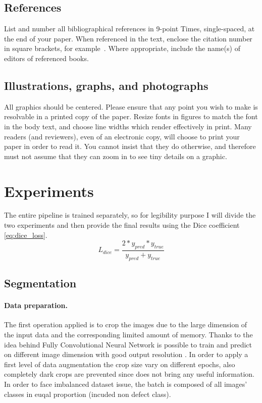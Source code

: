 \documentclass[10pt,twocolumn,letterpaper]{article}
\begin{document}
{\subsection{References}
List and number all bibliographical references in 9-point Times,
single-spaced, at the end of your paper. When referenced in the text,
enclose the citation number in square brackets, for
example~\cite{Authors14}.  Where appropriate, include the name(s) of
editors of referenced books.
\subsection{Illustrations, graphs, and photographs}
All graphics should be centered.  Please ensure that any point you wish to
make is resolvable in a printed copy of the paper.  Resize fonts in figures
to match the font in the body text, and choose line widths which render
effectively in print.  Many readers (and reviewers), even of an electronic
copy, will choose to print your paper in order to read it.  You cannot
insist that they do otherwise, and therefore must not assume that they can
zoom in to see tiny details on a graphic.}




\section{Experiments}
   The entire pipeline is trained separately, so for legibility purpose I will divide the two experiments and then provide the final results using the Dice coefficient \eqref{eq:dice_loss}.
   \begin{equation}\label{eq:dice_loss}
      L_{dice} = \frac{2 * y_{pred} * y_{true}}{y_{pred} + y_{true}}
   \end{equation}
   \subsection{Segmentation}
      \paragraph{Data preparation.}
         The first operation applied is to crop the images due to the large dimension of the input data and the corresponding limited amount of memory. Thanks to the idea behind Fully Convolutional Neural Network is possible to train and predict on different image dimension with good output resolution \cite{FCNN}.
         In order to apply a first level of data augmentation the crop size vary on different epochs, also completely dark crops are prevented since does not bring any useful information.
         In order to face imbalanced dataset issue, the batch is composed of all images' classes in euqal proportion (incuded non defect class).
\end{document}
